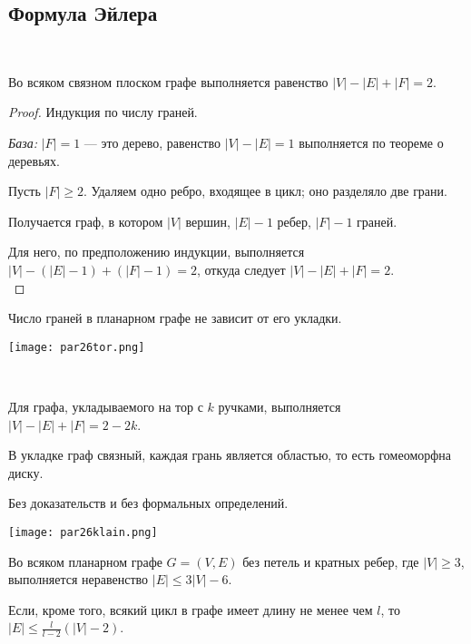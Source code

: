 \subsection{Формула Эйлера}

\begin{theorem}~

    Во всяком связном плоском графе выполняется равенство $|V| - |E| + |F| = 2$.
    
\end{theorem}

\begin{proof} 
    Индукция по числу граней.

    \textsl{База:} $|F| = 1$ --- это дерево, равенство $|V| - |E| = 1$ выполняется по теореме о деревьях.

    Пусть $|F| \geq 2$. Удаляем одно ребро, входящее в цикл; оно разделяло две грани.

    Получается граф, в котором $|V|$ вершин, $|E| - 1$ ребер, $|F| - 1$ граней.

    Для него, по предположению индукции, выполняется $|V| - (|E| - 1) + (|F| - 1) = 2$,
    откуда следует $|V| - |E| + |F| = 2$.\\

\end{proof}

\begin{follow}
    Число граней в планарном графе не зависит от его укладки.
\end{follow}


\begin{center}
    \texttt{[image: par26tor.png]}
\end{center}

\begin{theorem}~
    
    Для графа, укладываемого на тор с $k$ ручками, выполняется $|V| - |E| + |F| = 2 - 2k$.

    В укладке граф связный, каждая грань является областью, то есть гомеоморфна диску.

    Без доказательств и без формальных определений.

\end{theorem}

\begin{center}
    \texttt{[image: par26klain.png]}
\end{center}

\begin{theorem}
    \label{thm:3v6e}
    
    Во всяком планарном графе $G = (V, E)$ без петель и кратных ребер, где $|V| \geq 3$, выполняется неравенство $|E| \leq 3|V| - 6$.

    Если, кроме того, всякий цикл в графе имеет длину не менее чем $l$, то $|E| \leq \frac{l}{l - 2} (|V| - 2)$.

\end{theorem}

